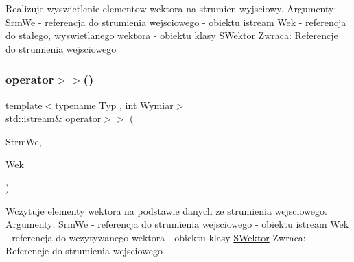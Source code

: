 Realizuje wyswietlenie elementow wektora na strumien wyjsciowy. Argumenty\+: Srm\+We -\/ referencja do strumienia wejsciowego -\/ obiektu istream Wek -\/ referencja do stałego, wyswietlanego wektora -\/ obiektu klasy \hyperlink{classSWektor}{S\+Wektor} Zwraca\+: Referencje do strumienia wejsciowego \mbox{\label{SWektor_8hh_a3f97e20d3fc20a4fee82eb8515b49e94}} 
\subsubsection{\texorpdfstring{operator$>$$>$()}{operator>>()}}
{\footnotesize\ttfamily template$<$typename Typ , int Wymiar$>$ \\
std\+::istream\& operator$>$$>$ (\begin{DoxyParamCaption}\item[{std\+::istream \&}]{Strm\+We,  }\item[{\hyperlink{classSWektor}{S\+Wektor}$<$ Typ, Wymiar $>$ \&}]{Wek }\end{DoxyParamCaption})}

Wczytuje elementy wektora na podstawie danych ze strumienia wejsciowego. Argumenty\+: Srm\+We -\/ referencja do strumienia wejsciowego -\/ obiektu istream Wek -\/ referencja do wczytywanego wektora -\/ obiektu klasy \hyperlink{classSWektor}{S\+Wektor} Zwraca\+: Referencje do strumienia wejsciowego 